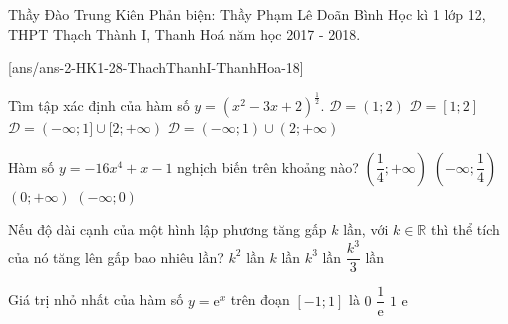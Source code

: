 \begin{name}
	{Thầy Đào Trung Kiên
		\newline Phản biện: Thầy Phạm Lê Doãn Bình}
	{Học kì 1 lớp 12, THPT Thạch Thành I, Thanh Hoá năm học 2017 - 2018.}
\end{name}
\setcounter{ex}{0}\setcounter{bt}{0}
[ans/ans-2-HK1-28-ThachThanhI-ThanhHoa-18]
\begin{ex}%
	Tìm tập xác định của hàm số $y=\left(x^2-3x+2\right)^{\tfrac{1}{2}}$.
	\choice
	{$\mathscr{D}=(1;2)$}
	{$\mathscr{D}=\left[1; 2\right]$}
	{$\mathscr{D}=(-\infty;1]\cup [2;+\infty)$}
	{\True $\mathscr{D}=(-\infty;1)\cup (2;+\infty)$}
\end{ex}


\begin{ex}%
	Hàm số $y=-16x^4+x-1$ nghịch biến trên khoảng nào?
	\choice
	{\True $\left(\dfrac{1}{4};+\infty\right)$}
	{$\left(-\infty; \dfrac{1}{4}\right)$}
	{$\left(0;+\infty\right)$}
	{$\left(-\infty; 0\right)$}
\end{ex}


\begin{ex}%
	Nếu độ dài cạnh của một hình lập phương tăng gấp $k$ lần, với $k\in \mathbb{R}$ thì thể tích của nó tăng lên gấp bao nhiêu lần?
	\choice
	{$k^2$ lần}
	{$k$ lần}
	{\True $k^3$ lần}
	{$\dfrac{k^3}{3}$ lần}
\end{ex}


\begin{ex}%
	Giá trị nhỏ nhất của hàm số $y=\mathrm{e}^x$ trên đoạn $\left[-1;1\right]$ là
	\choice
	{$0$}
	{\True $\dfrac{1}{\mathrm{e}}$}
	{$1$}
	{$\mathrm{e}$}
\end{ex}


